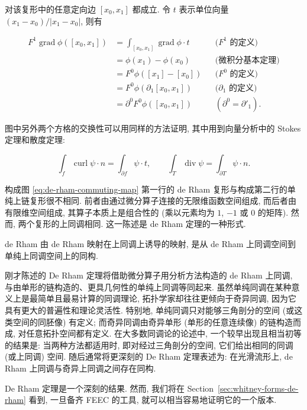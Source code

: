 {对该复形中的任意定向边 $[x_0,x_1]$ 都成立. 令 $t$ 表示单位向量 $(x_1-x_0)/|x_1-x_0|$, 则有}

\[
\begin{aligned}
F^1\operatorname{grad}\phi([x_0,x_1])
&=\int_{[x_0,x_1]}\operatorname{grad}\phi\cdot t
&&\text{{($F^1$ 的定义)}}\\
&=\phi(x_1)-\phi(x_0)
&&\text{{(微积分基本定理)}}\\
&=F^0\phi([x_1]-[x_0])
&&\text{{($F^0$ 的定义)}}\\
&=F^0\phi(\partial_1[x_0,x_1])
&&\text{{($\partial_1$ 的定义)}}\\
&=\partial^0F^0\phi([x_0,x_1])
&&(\partial^0=\partial'_1).
\end{aligned}
\]

{图中另外两个方格的交换性可以用同样的方法证明, 其中用到向量分析中的 Stokes 定理和散度定理:}

\[
\int_f\operatorname{curl}\psi\cdot n=\int_{\partial f}\psi\cdot t,\qquad
\int_T\operatorname{div}\psi=\int_{\partial T}\psi\cdot n.
\]

{构成图 \eqref{eq:de-rham-commuting-map} 第一行的 de Rham 复形与构成第二行的单纯上链复形很不相同. 前者由通过微分算子连接的无限维函数空间组成, 而后者由有限维空间组成, 其算子本质上是组合性的 (乘以元素均为 $1$, $-1$ 或 $0$ 的矩阵). 然而, 两个复形的上同调相同. 这一陈述是 de Rham 定理的一种形式.}

\begin{Theorem}{de Rham}\label{thm:de-rham-isomorphism}
{由 de Rham 映射在上同调上诱导的映射, 是从 de Rham 上同调空间到单纯上同调空间上的同构.}
\end{Theorem}

\begin{Remark}\label{rem:singular-simplicial-de-rham}
{刚才陈述的 De Rham 定理将借助微分算子用分析方法构造的 de Rham 上同调, 与由单形的链构造的、更具几何性的单纯上同调等同起来. 虽然单纯同调在某种意义上是最简单且最易计算的同调理论, 拓扑学家却往往更倾向于奇异同调, 因为它具有更大的普遍性和理论灵活性. 特别地, 单纯同调只对能够三角剖分的空间 (或这类空间的同胚像) 有定义; 而奇异同调由奇异单形 (单形的任意连续像) 的链构造而成, 对任意拓扑空间都有定义. 在大多数同调论的论述中, 一个较早出现且相当初等的结果是: 当两种方法都适用时, 即对经过三角剖分的空间, 它们给出相同的同调 (或上同调) 空间. 随后通常将更深刻的 De Rham 定理表述为: 在光滑流形上, de Rham 上同调与奇异上同调之间存在同构.}
\end{Remark}

{De Rham 定理是一个深刻的结果. 然而, 我们将在 Section~\ref{sec:whitney-forms-de-rham} 看到, 一旦备齐 FEEC 的工具, 就可以相当容易地证明它的一个版本.}
